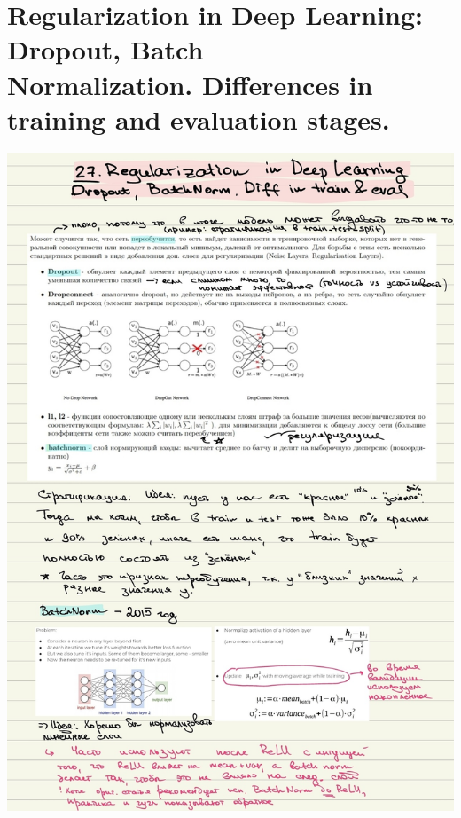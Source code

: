 \section{Regularization in Deep Learning: Dropout, Batch \\ Normalization. Differences in training and evaluation stages.}\label{27}
\includegraphics[width=400pt]{images/27_1.JPG}

